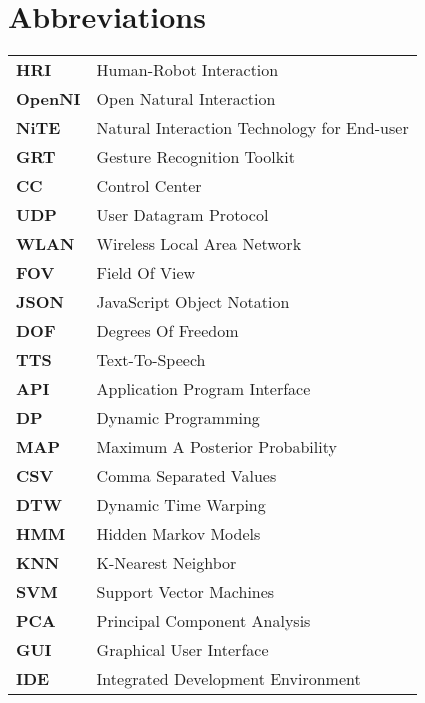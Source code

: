  {} 
\chapter*{Abbreviations}
\begin{center}
	\begin{tabular}
		{ll}

		\textbf{HRI} & Human-Robot Interaction\\		
		\textbf{OpenNI} & Open Natural Interaction\\
		\textbf{NiTE} & Natural Interaction Technology for End-user\\
		\textbf{GRT} & Gesture Recognition Toolkit\\
		\textbf{CC} & Control Center\\
		\textbf{UDP} & User Datagram Protocol\\
		\textbf{WLAN} & Wireless Local Area Network\\				
		\textbf{FOV} & Field Of View\\
		\textbf{JSON} & JavaScript Object Notation\\
		\textbf{DOF} & Degrees Of Freedom\\
		\textbf{TTS} & Text-To-Speech\\
		\textbf{API} & Application Program Interface\\		
		\textbf{DP} & Dynamic Programming\\		
		\textbf{MAP} & Maximum A Posterior Probability\\
		\textbf{CSV} & Comma Separated Values\\
		\textbf{DTW} & Dynamic Time Warping\\
		\textbf{HMM} & Hidden Markov Models\\
		\textbf{KNN} & K-Nearest Neighbor\\
		\textbf{SVM} & Support Vector Machines\\
		\textbf{PCA} & Principal Component Analysis\\
		\textbf{GUI} & Graphical User Interface\\
		\textbf{IDE} & Integrated Development Environment\\		
		
	\end{tabular}
\end{center}


